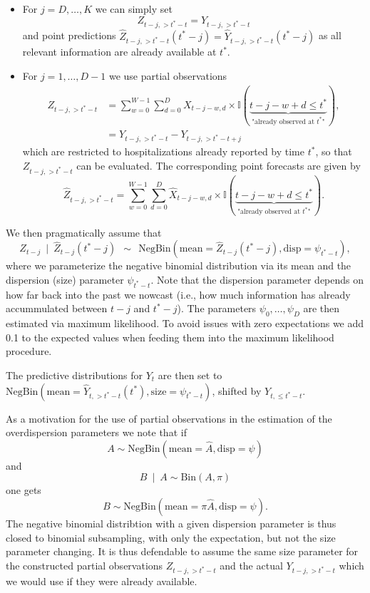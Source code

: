 \documentclass[a4paper, 11pt]{article}\usepackage[]{graphicx}\usepackage[]{color}
\begin{document}
\begin{itemize}
\item For $j = D, \dots, K$ we can simply set
$$
Z_{t - j, > t^* - t} = Y_{t - j, > t^* - t}
$$
and point predictions $\hat{Z}_{t - j, > t^* - t}(t^* - j) = \hat{Y}_{t - j, > t^* - t}(t^* - j)$ as all relevant information are already available at $t^*$.
\item For $j = 1, \dots, D - 1$ we use partial observations
\begin{align*}
Z_{t - j, >t^* - t} & = \sum_{w = 0}^{W - 1} \sum_{d = 0}^D X_{t - j - w, d} \times \mathbb{I}(\underbrace{t - j - w + d \leq t^*}_{\text{"already observed at } t^* \text{"}}),\\
& = Y_{t - j, > t^* - t} - Y_{t - j, > t^* - t + j}
\end{align*}
which are restricted to hospitalizations already reported by time $t^*$, so that $Z_{t - j, >t^* - t}$ can be evaluated. The corresponding point forecasts are given by
$$
\hat{Z}_{t - j, >t^* - t} = \sum_{w = 0}^{W - 1} \sum_{d = 0}^D \hat{X}_{t - j - w, d} \times \mathbb{I}(\underbrace{t - j - w + d \leq t^*}_{\text{"already observed at } t^* \text{"}}).
$$
\end{itemize}
We then pragmatically assume that
$$
Z_{t - j} \ \mid \ \hat Z_{t - j}(t^* - j) \ \ \sim \ \ \text{NegBin}(\text{mean} = \hat Z_{t - j}(t^* - j), \text{disp} = \psi_{t^* - t}),
$$
where we parameterize the negative binomial distribution via its mean and the dispersion (size) parameter $\psi_{t^* - t}$.
Note that the dispersion parameter depends on how far back into the past we nowcast (i.e., how much information has already accummulated between $t - j$ and $t^* - j$). The parameters $\psi_{0}, \dots, \psi_D$ are then estimated via maximum likelihood. To avoid issues with zero expectations we add 0.1 to the expected values when feeding them into the maximum likelihood procedure.

The predictive distributions for $Y_{t}$ are then set to $\text{NegBin}(\text{mean} = \hat{Y}_{t, > t^* - t}(t^*), \text{size} = \psi_{t^* - t})$, shifted by $Y_{t, \leq t^* - t}$.

As a motivation for the use of partial observations in the estimation of the overdispersion parameters we note that if
$$
A \sim \text{NegBin}(\text{mean} = \hat{A}, \text{disp} = \psi)
$$
and
$$
B \ \mid \ A \sim \text{Bin}(A, \pi)
$$
one gets
$$
B \sim \text{NegBin}(\text{mean} = \pi\hat{A}, \text{disp} = \psi).
$$
The negative binomial distribtion with a given dispersion parameter is thus closed to binomial subsampling, with only the expectation, but not the size parameter changing. It is thus defendable to assume the same size parameter for the constructed partial observations $Z_{t - j, > t^* - t}$ and the actual $Y_{t - j, > t^* - t}$ which we would use if they were already available.
\end{document}
